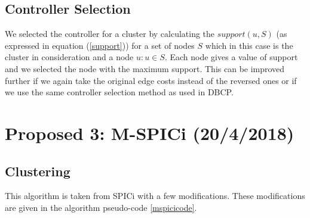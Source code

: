 \documentclass[10pt]{extarticle}
\begin{document}
	\subsection{Controller Selection}
	We selected the controller for a cluster by calculating the $support(u,S)$ (as expressed in equation (\ref{support})) for a set of nodes $S$ which in this case is the cluster in consideration and a node $u:u\in S$. Each node gives a value of support and we selected the node with the maximum support. This can be improved further if we again take the original edge costs instead of the reversed ones or if we use the same controller selection method as used in DBCP.
	
	\section{Proposed 3: M-SPICi (20/4/2018)} \label{mspici}
	
	\subsection{Clustering}
	This algorithm is taken from SPICi with a few modifications. These modifications are given in the algorithm pseudo-code \ref{mspicicode}.
	
\end{document}
